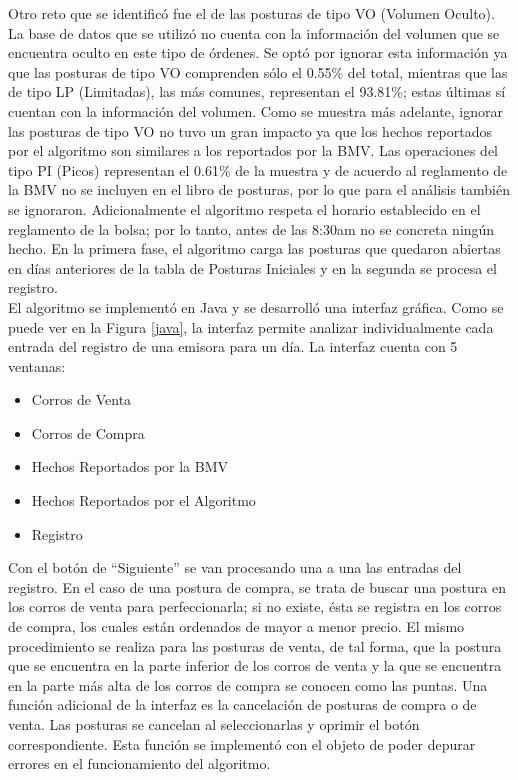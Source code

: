 \documentclass[11pt]{article}
\numberwithin{equation}{section} %
\begin{document}
Otro reto que se identificó fue el de las posturas de tipo VO (Volumen Oculto). La base de datos que se utilizó no cuenta con la información del volumen que se encuentra oculto en este tipo de órdenes. Se optó por ignorar esta información ya que las posturas de tipo VO comprenden sólo el 0.55\% del total, mientras que las de tipo LP (Limitadas), las más comunes, representan el 93.81\%; estas últimas sí cuentan con la información del volumen. Como se muestra más adelante, ignorar las posturas de tipo VO no tuvo un gran impacto ya que los hechos reportados por el algoritmo son similares a los reportados por la BMV. Las operaciones del tipo PI (Picos) representan el 0.61\% de la muestra y de acuerdo al reglamento de la BMV no se incluyen en el libro de posturas, por lo que para el análisis también se ignoraron. Adicionalmente el algoritmo respeta el horario establecido en el reglamento de la bolsa; por lo tanto, antes de las 8:30am no se concreta ningún hecho. En la primera fase, el algoritmo carga las posturas que quedaron abiertas en días anteriores de la tabla de Posturas Iniciales y en la segunda se procesa el registro.\\

El algoritmo se implementó en Java y se desarrolló una interfaz gráfica. Como se puede ver en la Figura \ref{java}, la interfaz permite analizar individualmente cada entrada del registro de una emisora para un día. La interfaz cuenta con 5 ventanas:
\begin{itemize}
  \item Corros de Venta
  \item Corros de Compra
  \item Hechos Reportados por la BMV
  \item Hechos Reportados por el Algoritmo
  \item Registro
\end{itemize}

Con el botón de ``Siguiente'' se van procesando una a una las entradas del registro. En el caso de una postura de compra, se trata de buscar una postura en los corros de venta para perfeccionarla; si no existe, ésta se registra en los corros de compra, los cuales están ordenados de mayor a menor precio. El mismo procedimiento se realiza para las posturas de venta, de tal forma, que la postura que se encuentra en la parte inferior de los corros de venta y la que se encuentra en la parte más alta de los corros de compra se conocen como las puntas. Una función adicional de la interfaz es la cancelación de posturas de compra o de venta. Las posturas se cancelan al seleccionarlas y oprimir el botón correspondiente. Esta función se implementó con el objeto de poder depurar errores en el funcionamiento del algoritmo.\\
\end{document}

